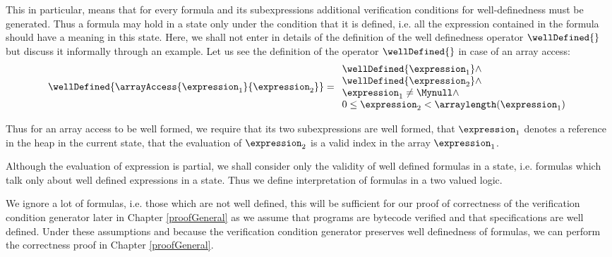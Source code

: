  This in particular, means that for every formula and its subexpressions additional verification conditions for well-definedness must be generated.
 Thus a formula may hold in a state only under the condition that
 it is  defined, i.e. all the expression contained in the formula should have a meaning in  this state.
  Here, we shall not enter in details of the definition of the well definedness operator  $\wellDefined{}$  but discuss it informally through an example.
   Let us see the definition of  the operator  $\wellDefined{}$   in case of an array access:
$$
\begin{array}{l}
 \wellDefined{ \arrayAccess{\expression_1} {\expression_2} } = 
            \begin{array}{l}
              \wellDefined{\expression_1} \wedge \\
     \wellDefined{\expression_2} \wedge \\
              \expression_1 \neq \Mynull \wedge\\
             0 \le  \expression_2 < \arraylength(\expression_1)
            \end{array} 
 \end{array}
$$

 Thus for an array access to be well formed, we require that its two subexpressions are well formed, that 
 $\expression_1$ denotes a reference in the heap in the current state, that the evaluation of $ \expression_2 $ is a valid index in the array 
 $\expression_1$. %
 
 Although the evaluation of expression is partial, we shall consider only the validity of well defined 
 formulas in a state, i.e. formulas which talk only about well defined expressions in a state. 
 Thus we define interpretation of formulas  in a two valued logic.
 
 We ignore a lot of formulas, i.e. those which are not well defined,
 this will be sufficient for our proof of correctness of the verification condition generator later in Chapter \ref{proofGeneral} as 
 we assume that programs are bytecode verified and that specifications
 are well defined. Under these assumptions and because the verification condition generator preserves well definedness of formulas, we 
 can perform the correctness proof in Chapter \ref{proofGeneral}.

